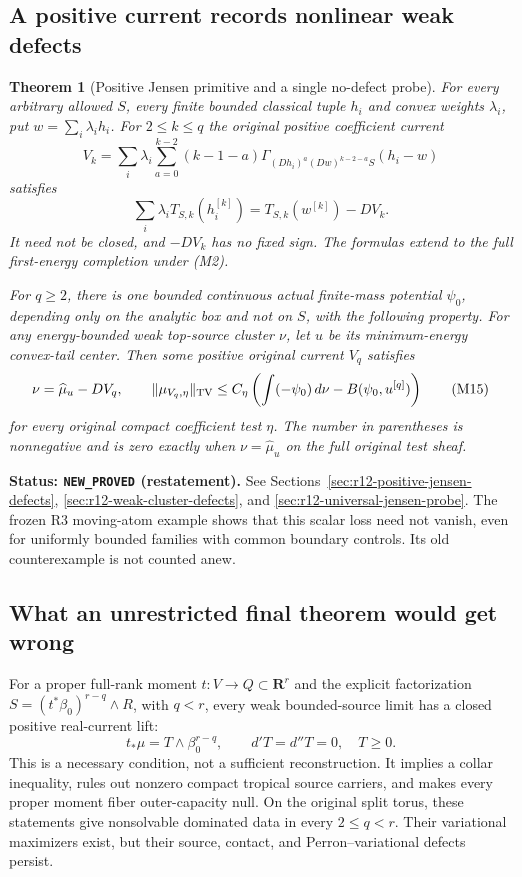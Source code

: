 \documentclass[11pt,a4paper]{article}
\numberwithin{equation}{section}
\newtheorem{theorem}{Theorem}[section]
\theoremstyle{definition}
\theoremstyle{remark}
\begin{document}
\subsection{A positive current records nonlinear weak defects}

\begin{theorem}[Positive Jensen primitive and a single no-defect probe]
\label{thm:r12-main-Jensen}
For every arbitrary allowed $S$, every finite bounded classical
tuple $h_i$ and convex weights $\lambda_i$, put
$w=\sum_i\lambda_i h_i$. For $2\leq k\leq q$ the original
positive coefficient current
\[
 V_k=\sum_i\lambda_i\sum_{a=0}^{k-2}(k-1-a)
       \Gamma_{(Dh_i)^a(Dw)^{k-2-a}S}(h_i-w)
 \tag{M13}
\]
satisfies
\[
                \sum_i\lambda_i T_{S,k}(h_i^{[k]})
                        =T_{S,k}(w^{[k]})-DV_k.
 \tag{M14}
\]
It need not be closed, and $-DV_k$ has no fixed sign.
The formulas extend to the full first-energy completion under (M2).

For $q\geq2$, there is one bounded continuous actual finite-mass potential
$\psi_0$, depending only on the analytic box and not on $S$,
with the following property. For any energy-bounded weak top-source
cluster $\nu$, let $u$ be its minimum-energy convex-tail center.
Then some positive original current $V_q$ satisfies
\[
 \nu=\widehat\mu_u-DV_q,\qquad
 \|\mu_{V_q,\eta}\|_{\rm TV}
       \leq C_\eta
       \left(\int(-\psi_0)\,d\nu-B(\psi_0,u^{[q]})\right)
 \tag{M15}
\]
for every original compact coefficient test $\eta$.
The number in parentheses is nonnegative and is zero exactly
when $\nu=\widehat\mu_u$ on the full original test sheaf.
\end{theorem}

\noindent\textbf{Status: \texttt{NEW\_PROVED} (restatement).}
See Sections~\ref{sec:r12-positive-jensen-defects},
\ref{sec:r12-weak-cluster-defects}, and
\ref{sec:r12-universal-jensen-probe}.
The frozen R3 moving-atom example shows that this scalar loss
need not vanish, even for uniformly bounded families with
common boundary controls. Its old counterexample is not counted anew.

\subsection{What an unrestricted final theorem would get wrong}

For a proper full-rank moment $t:V\to Q\subset\mathbf R^r$ and the
explicit factorization $S=(t^*\beta_0)^{r-q}\wedge R$, with $q<r$,
every weak bounded-source limit has a closed positive real-current
lift:
\[
                     t_*\mu=T\wedge\beta_0^{r-q},
                 \qquad d'T=d''T=0,\quad T\geq0.
 \tag{M16}
\]
This is a necessary condition, not a sufficient reconstruction.
It implies a collar inequality, rules out nonzero compact
tropical source carriers, and makes every proper moment fiber
outer-capacity null. On the original split torus, these statements
give nonsolvable dominated data in every $2\leq q<r$.
Their variational maximizers exist, but their source, contact,
and Perron--variational defects persist.
\end{document}
